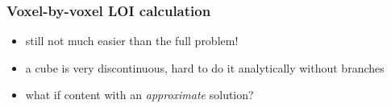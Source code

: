 \documentclass{beamer}
\begin{document}
\begin{frame}
  \frametitle{Voxel-by-voxel LOI calculation}
  \begin{itemize}
    \item still not much easier than the full problem!
    \item a cube is very discontinuous, hard to do it analytically without branches
    \item what if content with an \textsl{approximate} solution?
  \end{itemize}

  \begin{figure}
    \centering

\end{figure}
\end{frame}
\end{document}

